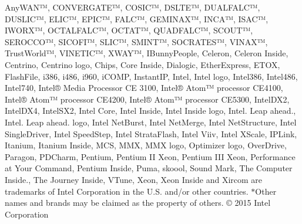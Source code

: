 Any\-W\-A\-N™, C\-O\-N\-V\-E\-R\-G\-A\-T\-E™, C\-O\-S\-I\-C™, D\-S\-L\-T\-E™, D\-U\-A\-L\-F\-A\-L\-C™, D\-U\-S\-L\-I\-C™, E\-L\-I\-C™, E\-P\-I\-C™, F\-A\-L\-C™, G\-E\-M\-I\-N\-A\-X™, I\-N\-C\-A™, I\-S\-A\-C™, I\-W\-O\-R\-X™, O\-C\-T\-A\-L\-F\-A\-L\-C™, O\-C\-T\-A\-T™, Q\-U\-A\-D\-F\-A\-L\-C™, S\-C\-O\-U\-T™, S\-E\-R\-O\-C\-C\-O™, S\-I\-C\-O\-F\-I™, S\-L\-I\-C™, S\-M\-I\-N\-T™, S\-O\-C\-R\-A\-T\-E\-S™, V\-I\-N\-A\-X™, Trust\-World™, V\-I\-N\-E\-T\-I\-C™, X\-W\-A\-Y™, I\-Bunny\-People, Celeron, Celeron Inside, Centrino, Centrino logo, Chips, Core Inside, Dialogic, Ether\-Express, E\-T\-O\-X, Flash\-File, i386, i486, i960, i\-C\-O\-M\-P, Instant\-I\-P, Intel, Intel logo, Intel386, Intel486, Intel740, Intel® Media Processor C\-E 3100, Intel® Atom™ processor C\-E4100, Intel® Atom™ processor C\-E4200, Intel® Atom™ processor C\-E5300, Intel\-D\-X2, Intel\-D\-X4, Intel\-S\-X2, Intel Core, Intel Inside, Intel Inside logo, Intel. Leap ahead., Intel. Leap ahead. logo, Intel Net\-Burst, Intel Net\-Merge, Intel Net\-Structure, Intel Single\-Driver, Intel Speed\-Step, Intel Strata\-Flash, Intel Viiv, Intel X\-Scale, I\-P\-Link, Itanium, Itanium Inside, M\-C\-S, M\-M\-X, M\-M\-X logo, Optimizer logo, Over\-Drive, Paragon, P\-D\-Charm, Pentium, Pentium I\-I Xeon, Pentium I\-I\-I Xeon, Performance at Your Command, Pentium Inside, Puma, skoool, Sound Mark, The Computer Inside., The Journey Inside, V\-Tune, Xeon, Xeon Inside and Xircom are trademarks of Intel Corporation in the U.\-S. and/or other countries. $\ast$\-Other names and brands may be claimed as the property of others. © 2015 Intel Corporation 